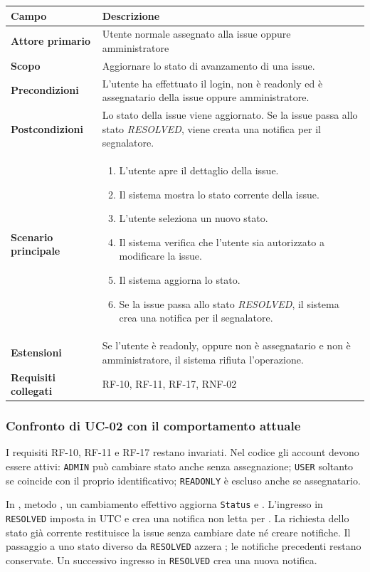 \documentclass[12pt,a4paper]{article}
\begin{document}
\begin{tabularx}{\textwidth}{>{\bfseries}p{} X}
\toprule
Campo & Descrizione \\
\midrule
Attore primario & Utente normale assegnato alla issue oppure amministratore \\
Scopo & Aggiornare lo stato di avanzamento di una issue. \\
Precondizioni & L'utente ha effettuato il login, non è readonly ed è assegnatario della issue oppure amministratore. \\
Postcondizioni & Lo stato della issue viene aggiornato. Se la issue passa allo stato \textit{RESOLVED}, viene creata una notifica per il segnalatore. \\
Scenario principale &
\begin{enumerate}[noitemsep]
    \item L'utente apre il dettaglio della issue.
    \item Il sistema mostra lo stato corrente della issue.
    \item L'utente seleziona un nuovo stato.
    \item Il sistema verifica che l'utente sia autorizzato a modificare la issue.
    \item Il sistema aggiorna lo stato.
    \item Se la issue passa allo stato \textit{RESOLVED}, il sistema crea una notifica per il segnalatore.
\end{enumerate} \\
Estensioni & Se l'utente è readonly, oppure non è assegnatario e non è amministratore, il sistema rifiuta l'operazione. \\
Requisiti collegati & RF-10, RF-11, RF-17, RNF-02 \\
\bottomrule
\end{tabularx}

\subsubsection{Confronto di UC-02 con il comportamento attuale}

I requisiti RF-10, RF-11 e RF-17 restano invariati. Nel codice gli account devono essere attivi: \texttt{ADMIN} può cambiare stato anche senza assegnazione; \texttt{USER} soltanto se  coincide con il proprio identificativo; \texttt{READONLY} è escluso anche se assegnatario.

In , metodo , un cambiamento effettivo aggiorna \texttt{Status} e . L'ingresso in \texttt{RESOLVED} imposta  in UTC e crea una notifica non letta per . La richiesta dello stato già corrente restituisce la issue senza cambiare date né creare notifiche. Il passaggio a uno stato diverso da \texttt{RESOLVED} azzera ; le notifiche precedenti restano conservate. Un successivo ingresso in \texttt{RESOLVED} crea una nuova notifica.
\end{document}
